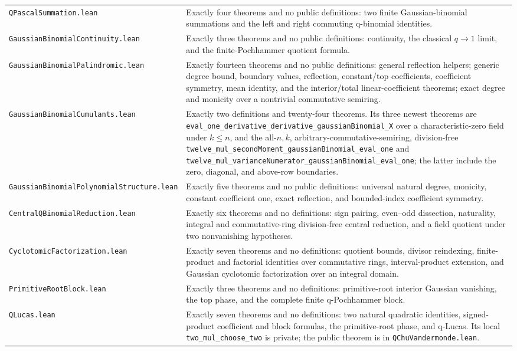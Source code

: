 \documentclass[11pt,oneside]{article}
\theoremstyle{definition}
\theoremstyle{remark}
\begin{document}
\begin{longtable}{>{\raggedright\arraybackslash}p{} >{\raggedright\arraybackslash}p{}}
\nolinkurl{QPascalSummation.lean} & Exactly four theorems and no public definitions: two finite Gaussian-binomial summations and the left and right commuting q-binomial identities. \\
\nolinkurl{GaussianBinomialContinuity.lean} & Exactly three theorems and no public definitions: continuity, the classical \(q\to1\) limit, and the finite-Pochhammer quotient formula. \\
\nolinkurl{GaussianBinomialPalindromic.lean} & Exactly fourteen theorems and no public definitions: general reflection helpers; generic degree bound, boundary values, reflection, constant/top coefficients, coefficient symmetry, mean identity, and the interior/total linear-coefficient theorems; exact degree and monicity over a nontrivial commutative semiring. \\
\nolinkurl{GaussianBinomialCumulants.lean} & Exactly two definitions and twenty-four theorems.  Its three newest theorems are \nolinkurl{eval_one_derivative_derivative_gaussianBinomial_X} over a characteristic-zero field under \(k\le n\), and the all-\(n,k\), arbitrary-commutative-semiring, division-free \nolinkurl{twelve_mul_secondMoment_gaussianBinomial_eval_one} and \nolinkurl{twelve_mul_varianceNumerator_gaussianBinomial_eval_one}; the latter include the zero, diagonal, and above-row boundaries. \\
\nolinkurl{GaussianBinomialPolynomialStructure.lean} & Exactly five theorems and no public definitions: universal natural degree, monicity, constant coefficient one, exact reflection, and bounded-index coefficient symmetry. \\
\nolinkurl{CentralQBinomialReduction.lean} & Exactly six theorems and no definitions: sign pairing, even--odd dissection, naturality, integral and commutative-ring division-free central reduction, and a field quotient under two nonvanishing hypotheses. \\
\nolinkurl{CyclotomicFactorization.lean} & Exactly seven theorems and no definitions: quotient bounds, divisor reindexing, finite-product and factorial identities over commutative rings, interval-product extension, and Gaussian cyclotomic factorization over an integral domain. \\
\nolinkurl{PrimitiveRootBlock.lean} & Exactly three theorems and no definitions: primitive-root interior Gaussian vanishing, the top phase, and the complete finite q-Pochhammer block. \\
\nolinkurl{QLucas.lean} & Exactly seven theorems and no definitions: two natural quadratic identities, signed-product coefficient and block formulas, the primitive-root phase, and q-Lucas.  Its local \nolinkurl{two_mul_choose_two} is private; the public theorem is in \nolinkurl{QChuVandermonde.lean}. \\

\end{longtable}
\end{document}
